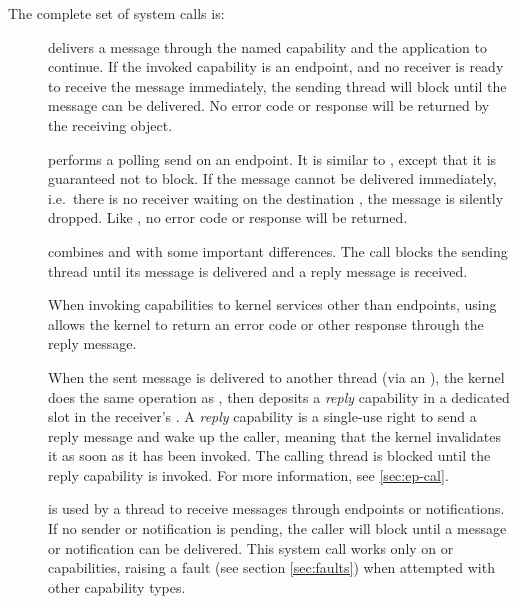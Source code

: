The complete set of system calls is:
\begin{description}
    \item[] delivers a message through the named
    capability and the application to continue. If the invoked
    capability is an endpoint, and no receiver is ready to receive the message
    immediately, the sending thread will block until the message can be
    delivered. No error code or response will be returned by the receiving
    object.

    \item[] performs a polling send
      on an endpoint. It
    is similar to , except that it is
    guaranteed not to block. If the message
    cannot be delivered immediately, i.e.\ there is no receiver waiting
    on the destination , the message is silently dropped. Like
    , no error code or response will be returned.

    \item[] combines 
      and  with some important differences. The call
      blocks the sending thread until its message is delivered and a reply
      message is received.

      When invoking capabilities to kernel services other than endpoints, using
       allows the kernel to return an error code
      or other response through the reply message.

      When the sent message is delivered to another thread (via an
      ), the kernel does the same operation as
      , then deposits a \emph{reply} capability
      in a dedicated slot in the receiver's . A \emph{reply} capability
      is a single-use right to send a reply message and wake up the caller,
      meaning that the kernel invalidates it as soon as it has been invoked.
      The calling thread is blocked until the reply capability is invoked.
      For more information, see \autoref{sec:ep-cal}.

    \item[] is used by a thread to receive
    messages through endpoints or notifications. If no sender or
    notification is pending, the caller
    will block until a message or notification can be delivered. This system call works only on
     or  capabilities, raising a fault
    (see section \ref{sec:faults}) when
    attempted with other capability types.


\end{description}

